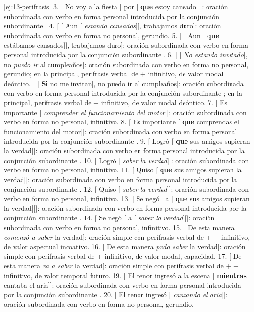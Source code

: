 \begin{solucion}{\ref{ej:13-perifrasis}}
3. [ No voy a la fiesta [ por [ \textbf{que} estoy
cansado]]]: oración subordinada con verbo en forma personal introducida por la
conjunción subordinante . 4. [ [ Aun [
\textit{estando cansados}]], trabajamos duro]: oración subordinada con verbo en
forma no personal, gerundio. 5. [ [ Aun [
\textbf{que} estábamos cansados]], trabajamos duro]: oración subordinada con
verbo en forma personal introducida por la conjunción subordinante .
6. [ [ \textit{No estando invitado}], no \textit{puedo ir} al
cumpleaños]: oración subordinada con verbo en forma no personal, gerundio; en la
principal, perífrasis verbal de  + infinitivo, de valor modal
deóntico. [ [ \textbf{Si} no me invitan], no puedo ir al
cumpleaños]: oración subordinada con verbo en forma personal introducida por la
conjunción subordinante ; en la principal, perífrasis verbal de
 + infinitivo, de valor modal deóntico. 7. [ Es
importante [ \textit{comprender el funcionamiento del motor}]]: oración
subordinada con verbo en forma no personal, infinitivo. 8. [ Es
importante [ \textbf{que} comprendas el funcionamiento del motor]]:
oración subordinada con verbo en forma personal introducida por la conjunción
subordinante . 9. [ Logró [ \textbf{que} sus
amigos supieran la verdad]]: oración subordinada con verbo en forma personal
introducida por la conjunción subordinante . 10. [ Logró
[ \textit{saber la verdad}]]: oración subordinada con verbo en forma no
personal, infinitivo. 11. [ Quiso [ \textbf{que} sus amigos
supieran la verdad]]: oración subordinada con verbo en forma personal
introducida por la conjunción subordinante . 12. [ Quiso
[ \textit{saber la verdad}]]: oración subordinada con verbo en forma no
personal, infinitivo. 13. [ Se negó [ a [
\textbf{que} sus amigos supieran la verdad]]]: oración subordinada con verbo en
forma personal introducida por la conjunción subordinante . 14.
[ Se negó [ a [ \textit{saber la verdad}]]]: oración
subordinada con verbo en forma no personal, infinitivo. 15. [ De esta
manera \textit{comenzó a saber} la verdad]: oración simple con perífrasis verbal
de  +  + infinitivo, de valor aspectual incoativo. 16.
[ De esta manera \textit{pudo saber} la verdad]: oración simple con
perífrasis verbal de  + infinitivo, de valor modal, capacidad. 17.
[ De esta manera \textit{va a saber} la verdad]: oración simple con
perífrasis verbal de  +  + infinitivo, de valor temporal
futuro. 19. [ El tenor ingresó a la escena [ \textbf{mientras}
cantaba el aria]]: oración subordinada con verbo en forma personal introducida
por la conjunción subordinante . 20. [ El tenor
ingresó [ \textit{cantando el aria}]]: oración subordinada con verbo en
forma no personal, gerundio.
\end{solucion}

